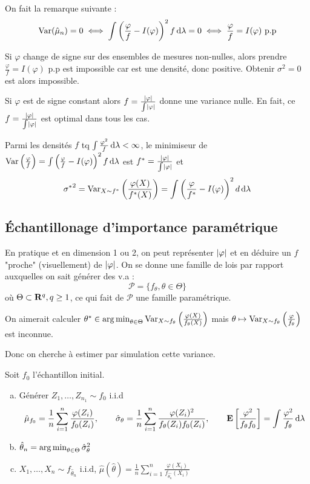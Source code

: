 	On fait la remarque suivante : 
	$$\operatorname{Var}(\hat{\mu}_n) = 0
	\iff \int \left( \frac{\varphi}{f} - I(\varphi) \right)^2 f \mathop{}\mathopen{}\mathrm{d} \lambda = 0
	\iff \frac{\varphi}{f} = I(\varphi)\ \text{p.p}$$
	
	Si $\varphi$ change de signe sur des ensembles de mesures non-nulles, alors prendre $\frac{\varphi}{f} = I(\varphi)$ p.p est impossible car est une densité, donc positive.
	Obtenir $\sigma^2 = 0$ est alors impossible.
	
	Si $\varphi$ est de signe constant alors $f = \frac{\left\lvert\varphi\right\rvert}{\int \left\lvert\varphi\right\rvert}$ donne une variance nulle.
	En fait, ce $f = \frac{\left\lvert\varphi\right\rvert}{\int \left\lvert\varphi\right\rvert}$ est optimal dans tous les cas.

	\begin{thm}
		Parmi les densités $f$ tq $\int \frac{\varphi^2}{f} \mathop{}\mathopen{}\mathrm{d} \lambda < \infty$, le minimiseur de $\operatorname{Var} \left( \frac{\varphi}{f} \right) = \int \left( \frac{\varphi}{f} - I(\varphi) \right)^2 f \mathop{}\mathopen{}\mathrm{d} \lambda$ est $f^* = \frac{\left\lvert\varphi\right\rvert}{\int \left\lvert\varphi\right\rvert}$ et
		$${\sigma^*}^2 = \operatorname{Var}_{X \sim f^*} \left( \frac{\varphi(X)}{f^*(X)} \right)
		= \int \left( \frac{\varphi}{f^*} - I(\varphi) \right)^2 d \mathop{}\mathopen{}\mathrm{d} \lambda$$
	\end{thm}


\subsection{Échantillonage d'importance paramétrique}

	En pratique et en dimension 1 ou 2, on peut représenter $\left\lvert\varphi\right\rvert$ et en déduire un $f$ "proche" (visuellement) de $\left\lvert\varphi\right\rvert$.
	On se donne une famille de lois par rapport auxquelles on sait générer des v.a :
	$$\mathcal{P} = \{ f_\theta, \theta \in \Theta \}$$
	où $\Theta \subset \mathbf{R}^q, q \geq 1$, ce qui fait de $\mathcal{P}$ une famille paramétrique.
	
	On aimerait calculer $\theta^* \in \operatorname{arg\, min}_{\theta \in \Theta} \operatorname{Var}_{X \sim f_\theta} \left( \frac{\varphi(X)}{f_\theta(X)} \right)$ mais $\theta \mapsto \operatorname{Var}_{X \sim f_\theta} \left( \frac{\varphi}{f_\theta} \right)$ est inconnue.
	
	Donc on cherche à estimer par simulation cette variance.
	
	Soit $f_0$ l'échantillon initial.
	\begin{enumerate}[a)]
		\item Générer $Z_1,\ldots,Z_{n_1} \sim f_0$ i.i.d
			$$\hat{\mu}_{f_0} = \frac{1}{n} \sum_{i = 1}^n \frac{\varphi(Z_i)}{f_0(Z_i)},
			\qquad \hat{\sigma}_\theta = \frac{1}{n} \sum_{i = 1}^n \frac{\varphi(Z_i)^2}{f_\theta(Z_i) f_0(Z_i)},
			\qquad \mathbf{E} \left[ \frac{\varphi^2}{f_\theta f_0} \right] = \int \frac{\varphi^2}{f_\theta} \mathop{}\mathopen{}\mathrm{d} \lambda$$
		\item $\hat{\theta}_n = \operatorname{arg\, min}_{\theta \in \Theta} \hat{\sigma}_\theta^2$
		\item $X_1,\ldots,X_n \sim f_{\hat{\theta}_n}$ i.i.d, $\hat{\mu}(\hat{\theta}) = \frac{1}{n} \sum_{i = 1}^n \frac{\varphi(X_i)}{f_{\hat{\theta_n}}(X_i)}$
	\end{enumerate}